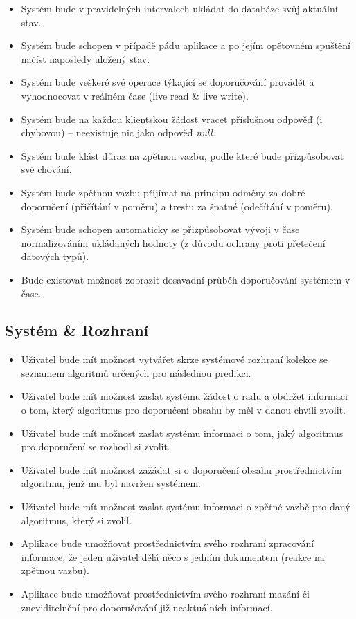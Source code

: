 \documentclass[thesis=M,czech]{FITthesis}[2014/05/07]
\begin{document}
\begin{itemize}
	\item Systém bude v pravidelných intervalech ukládat do databáze svůj aktuální stav.
	\item Systém bude schopen v případě pádu aplikace a po jejím opětovném spuštění načíst naposledy uložený stav.
	\item Systém bude veškeré své operace týkající se doporučování provádět a vyhodnocovat v reálném čase (live read \& live write).
	\item Systém bude na každou klientskou žádost vracet příslušnou odpověď (i chybovou) – neexistuje nic jako odpověď \emph{null}.	
	\item Systém bude klást důraz na zpětnou vazbu, podle které bude přizpůsobovat své chování.
	\item Systém bude zpětnou vazbu přijímat na principu odměny za dobré doporučení (přičítání v poměru) a trestu za špatné (odečítání v poměru).
	\item Systém bude schopen automaticky se přizpůsobovat vývoji v čase normalizováním ukládaných hodnoty (z důvodu ochrany proti přetečení datových typů).
	\item Bude existovat možnost zobrazit dosavadní průběh doporučování systémem v čase.	
\end{itemize}

\subsection{Systém \& Rozhraní}

\begin{itemize}
	\item Uživatel bude mít možnost vytvářet skrze systémové rozhraní kolekce se seznamem algoritmů určených pro následnou predikci.
	\item Uživatel bude mít možnost zaslat systému žádost o radu a obdržet informaci o tom, který algoritmus pro doporučení obsahu by měl v danou chvíli zvolit.
	\item Uživatel bude mít možnost zaslat systému informaci o tom, jaký algoritmus pro doporučení se rozhodl si zvolit.
	\item Uživatel bude mít možnost zažádat si o doporučení obsahu prostřednictvím algoritmu, jenž mu byl navržen systémem.
	\item Uživatel bude mít možnost zaslat systému informaci o zpětné vazbě pro daný algoritmus, který si zvolil.
	\item Aplikace bude umožňovat prostřednictvím svého rozhraní zpracování informace, že jeden uživatel dělá něco s jedním dokumentem (reakce na zpětnou vazbu).
	\item Aplikace bude umožňovat prostřednictvím svého rozhraní mazání či zneviditelnění pro doporučování již neaktuálních informací.
\end{itemize}
\end{document}
